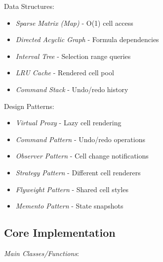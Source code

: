 \documentclass[11pt]{article}
\begin{document}
Data Structures:

\begin{itemize}
\item \emph{Sparse Matrix (Map)} - O(1) cell access
\item \emph{Directed Acyclic Graph} - Formula dependencies
\item \emph{Interval Tree} - Selection range queries
\item \emph{LRU Cache} - Rendered cell pool
\item \emph{Command Stack} - Undo/redo history
\end{itemize}

Design Patterns:

\begin{itemize}
\item \emph{Virtual Proxy} - Lazy cell rendering
\item \emph{Command Pattern} - Undo/redo operations
\item \emph{Observer Pattern} - Cell change notifications
\item \emph{Strategy Pattern} - Different cell renderers
\item \emph{Flyweight Pattern} - Shared cell styles
\item \emph{Memento Pattern} - State snapshots
\end{itemize}
\subsection{Core Implementation}
\label{sec:orgb845382}

\emph{Main Classes/Functions}:
\end{document}
